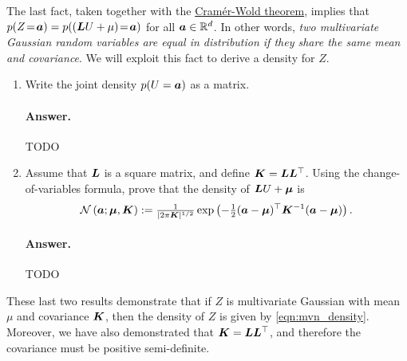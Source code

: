 \documentclass[11pt,letterpaper]{article}
\newenvironment{answer}{%
    \vspace{1em}
    \color{black}
    \paragraph{Answer.}
  }{%
    \vspace{1em}
  }
\begin{document}
The last fact, taken together with the \href{https://en.wikipedia.org/wiki/Cram\%C3\%A9r\%E2\%80\%93Wold_theorem}{Cram\'er-Wold theorem},
implies that $p(Z \! = \! {\bm{a}}) = p(({\bm{L}} U + \mu) \! = \! {\bm{a}})$ for all ${\bm{a}} \in \mathbb{R}^d$.
In other words, \emph{two multivariate Gaussian random variables are equal in distribution if they share the same mean and covariance}.
We will exploit this fact to derive a density for $Z$.


\begin{enumerate}[resume]
  \item Write the joint density $p(U = {\bm{a}})$ as a matrix.

\begin{answer}
  TODO
\end{answer}


  \item Assume that ${\bm{L}}$ is a square matrix, and define ${\bm{K}} = {\bm{L}}{\bm{L}}^\top$.
    Using the change-of-variables formula, prove that the density of ${\bm{L}} U + {\bm{\mu}}$ is
    \begin{equation}
      \mathcal{N} \left( {\bm{a}}; {\bm{\mu}}, {\bm{K}} \right)
      := \tfrac{1}{\vert 2 \pi {\bm{K}} \vert^{1/2}} \exp \left( -\tfrac{1}{2} ({\bm{a}} - {\bm{\mu}})^\top {\bm{K}}^{-1} ({\bm{a}} - {\bm{\mu}}) \right).
      \label{eqn:mvn_density}
    \end{equation}

\begin{answer}
  TODO
\end{answer}

\end{enumerate}

These last two results demonstrate that if $Z$ is multivariate Gaussian with mean $\mu$ and covariance ${\bm{K}}$,
then the density of $Z$ is given by \cref{eqn:mvn_density}.
Moreover, we have also demonstrated that ${\bm{K}} = {\bm{L}} {\bm{L}}^\top$, and therefore the covariance must be positive semi-definite.
\end{document}
